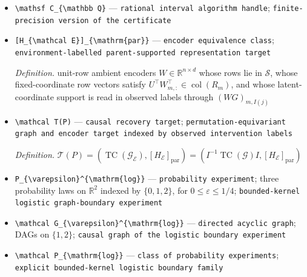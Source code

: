 \documentclass{article}
\begin{document}
\begin{itemize}
  \item \texttt{\textbackslash{}\allowbreak{}mathsf C\_\allowbreak{}\{\textbackslash{}\allowbreak{}mathbb Q\}\allowbreak{}} --- \texttt{rational interval algorithm handle}; \texttt{finite-\allowbreak{}precision version of the certificate}
  \item \texttt{[H\_\allowbreak{}\{\textbackslash{}\allowbreak{}mathcal E\}\allowbreak{}]\_\allowbreak{}\{\textbackslash{}\allowbreak{}mathrm\{par\}\allowbreak{}\}\allowbreak{}} --- \texttt{encoder equivalence class}; \texttt{environment-\allowbreak{}labelled parent-\allowbreak{}supported representation target}
  \par\smallskip\noindent\emph{Definition.} unit-row ambient encoders \(W\in\mathbb R^{n\times d}\) whose rows lie in \(\mathcal S\), whose fixed-coordinate row vectors satisfy \(U^{\top}W_{m,:}^{\top}\in\operatorname{col}(R_m)\), and whose latent-coordinate support is read in observed labels through \((WG)_{m,I(j)}\)
  \item \texttt{\textbackslash{}\allowbreak{}mathcal T(P)} --- \texttt{causal recovery target}; \texttt{permutation-\allowbreak{}equivariant graph and encoder target indexed by observed intervention labels}
  \par\smallskip\noindent\emph{Definition.} \(\mathcal T(P)=(\operatorname{TC}(\mathcal G_{\mathcal E}),[H_{\mathcal E}]_{\mathrm{par}})=(I^{-1}\operatorname{TC}(\mathcal G)I,[H_{\mathcal E}]_{\mathrm{par}})\)
  \item \texttt{P\_\allowbreak{}\{\textbackslash{}\allowbreak{}varepsilon\}\allowbreak{}\textasciicircum{}\{\textbackslash{}\allowbreak{}mathrm\{log\}\allowbreak{}\}\allowbreak{}} --- \texttt{probability experiment}; three probability laws on \(\mathbb R^2\) indexed by \(\{0,1,2\}\), for \(0\le\varepsilon\le1/4\); \texttt{bounded-\allowbreak{}kernel logistic graph-\allowbreak{}boundary experiment}
  \item \texttt{\textbackslash{}\allowbreak{}mathcal G\_\allowbreak{}\{\textbackslash{}\allowbreak{}varepsilon\}\allowbreak{}\textasciicircum{}\{\textbackslash{}\allowbreak{}mathrm\{log\}\allowbreak{}\}\allowbreak{}} --- \texttt{directed acyclic graph}; DAGs on \(\{1,2\}\); \texttt{causal graph of the logistic boundary experiment}
  \item \texttt{\textbackslash{}\allowbreak{}mathcal P\_\allowbreak{}\{\textbackslash{}\allowbreak{}mathrm\{log\}\allowbreak{}\}\allowbreak{}} --- \texttt{class of probability experiments}; \texttt{explicit bounded-\allowbreak{}kernel logistic boundary family}

\end{itemize}
\end{document}
